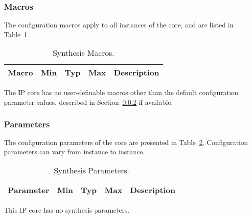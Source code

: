 \subsubsection{Macros}

\ifdefined\SM

The configuration macros apply to all instances of the core, and are listed in
Table~\ref{tab:sm}.

\begin{table}[h]
  \centering
    \begin{tabularx}{\textwidth}{ | c | c | c | c | X | }
    \hline
    \rowcolor{iob-green}
    {\bf Macro} & {\bf Min} & {\bf Typ} & {\bf Max} & {\bf Description} \\\hline

    

    \end{tabularx}
  \caption{Synthesis Macros.}
  \label{tab:sm}
\end{table}

\noindent

\else
The IP core has no user-definable macros other than the default configuration parameter values, described in Section~\ref{sec:cp} if available.
\fi


\subsubsection{Parameters}
\label{sec:cp}
\ifdefined\SP

The configuration parameters of the core are presented in
Table~\ref{tab:sp}. Configuration parameters can vary from instance to instance.

\begin{table}[h]
  \centering
    \begin{tabularx}{\textwidth}{ | c | c | c | c | X | }
    \hline
    \rowcolor{iob-green}
    {\bf Parameter} & {\bf Min} & {\bf Typ} & {\bf Max} & {\bf Description} \\\hline

    

    \end{tabularx}
    
\caption{Synthesis Parameters.}
  \label{tab:sp}
\end{table}

\else

This IP core has no synthesis parameters.

\fi
